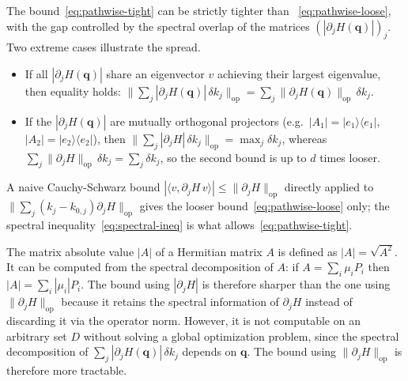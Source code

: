 \documentclass[11pt]{article}
\numberwithin{equation}{section}
\begin{document}
\begin{remark}
    The bound~\eqref{eq:pathwise-tight} can be strictly tighter than
    ~\eqref{eq:pathwise-loose}, with the gap controlled by the spectral
    overlap of the matrices \((|\partial_j H(\mathbf{q})|)_j\). Two extreme
    cases illustrate the spread.
    \begin{itemize}
        \item If all \(|\partial_j H(\mathbf{q})|\) share an eigenvector
              \(v\) achieving their largest eigenvalue, then equality holds:
              \(\|\sum_j |\partial_j H(\mathbf{q})|\,\delta k_j\|_\mathrm{op}
              = \sum_j \|\partial_j H(\mathbf{q})\|_\mathrm{op}\,\delta k_j\).
        \item If the \(|\partial_j H(\mathbf{q})|\) are mutually orthogonal
              projectors (e.g.\ \(|A_1| = |e_1\rangle\langle e_1|\),
              \(|A_2| = |e_2\rangle\langle e_2|\)), then
              \(\|\sum_j |\partial_j H|\,\delta k_j\|_\mathrm{op}
              = \max_j \delta k_j\), whereas
              \(\sum_j \|\partial_j H\|_\mathrm{op}\,\delta k_j
              = \sum_j \delta k_j\), so the second bound is up to \(d\) times
              looser.
    \end{itemize}
    A naive Cauchy-Schwarz bound \(|\langle v, \partial_j H\, v\rangle|
    \leq \|\partial_j H\|_\mathrm{op}\) directly applied to
    \(\|\sum_j (k_j - k_{0,j}) \partial_j H\|_\mathrm{op}\) gives the looser
    bound~\eqref{eq:pathwise-loose} only; the spectral
    inequality~\eqref{eq:spectral-ineq} is what allows~\eqref{eq:pathwise-tight}.
\end{remark}
\begin{remark}
    The matrix absolute value \(|A|\) of a Hermitian matrix \(A\) is defined as \(|A| =
    \sqrt{A^2}\). It can be computed from the spectral decomposition of \(A\): if \(A =
    \sum_i \mu_i P_i\) then \(|A| = \sum_i |\mu_i| P_i\). The bound using \(|\partial_j
    H|\) is therefore sharper than the one using \(\|\partial_j H\|_\mathrm{op}\) because
    it retains the spectral information of \(\partial_j H\) instead of discarding it via
    the operator norm. However, it is not computable on an arbitrary set \(D\) without
    solving a global optimization problem, since the spectral decomposition of \(\sum_j
    |\partial_j H(\mathbf{q})|\,\delta k_j\) depends on \(\mathbf{q}\). The bound using
    \(\|\partial_j H\|_\mathrm{op}\) is therefore more tractable.
\end{remark}
\end{document}

